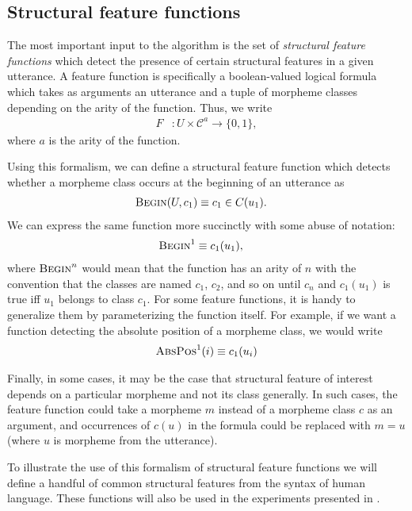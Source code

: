 
\subsection{Structural feature functions}

The most important input to the algorithm is the set of \emph{structural feature functions} which detect the presence of certain structural features in a given utterance.
A feature function is specifically a boolean-valued logical formula which takes as arguments an utterance and a tuple of morpheme classes depending on the arity of the function.
Thus, we write
\begin{align}
  F &: U \times \mathcal C^a \rightarrow \{0,1\}
  ,
\end{align}
where $a$ is the arity of the function.

Using this formalism, we can define a structural feature function which detects whether a morpheme class occurs at the beginning of an utterance as
\begin{align}
  \textsc{Begin}(U, c_1) &\equiv c_1 \in C(u_1)
  .
\end{align}
We can express the same function more succinctly with some abuse of notation:
\begin{align}
  \textsc{Begin}^1 &\equiv c_1(u_1)
  ,
\end{align}
where $\textsc{Begin}^n$ would mean that the function has an arity of $n$ with the convention that the classes are named $c_1$, $c_2$, and so on until $c_n$
  and $c_1(u_1)$ is true iff $u_1$ belongs to class $c_1$.
For some feature functions, it is handy to generalize them by parameterizing the function itself.
For example, if we want a function detecting the absolute position of a morpheme class, we would write
\begin{align}
  \textsc{AbsPos}^1(i) \equiv c_1(u_i)
\end{align}

Finally, in some cases, it may be the case that structural feature of interest depends on a particular morpheme and not its class generally.
In such cases, the feature function could take a morpheme $m$ instead of a morpheme class $c$ as an argument, and occurrences of $c(u)$ in the formula could be replaced with $m = u$ (where $u$ is morpheme from the utterance).

To illustrate the use of this formalism of structural feature functions we will define a handful of common structural features from the syntax of human language.
These functions will also be used in the experiments presented in .


